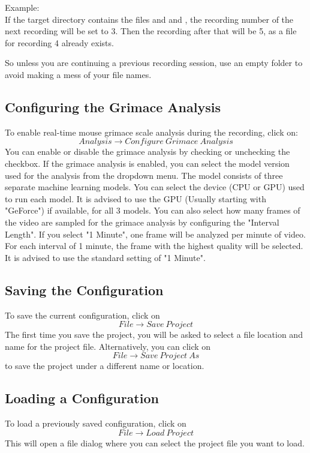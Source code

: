 Example:\\
If the target directory contains the files  and  and , 
the recording number of the next recording will be set to 3. Then the recording after that will be 5, 
as a file for recording 4 already exists.  

So unless you are continuing a previous recording session, 
use an empty folder to avoid making a mess of your file names.

\subsection{Configuring the Grimace Analysis}
To enable real-time mouse grimace scale analysis during the recording, 
click on: \[Analysis \rightarrow Configure\ Grimace\ Analysis\] 
You can enable or disable the grimace analysis by checking or unchecking the checkbox.  
If the grimace analysis is enabled, you can select the model version used for the analysis from the dropdown menu.  
The model consists of three separate machine learning models.  
You can select the device (CPU or GPU) used to run each model.
It is advised to use the GPU (Usually starting with "GeForce") if available, for all 3 models.  
You can also select how many frames of the video are sampled for the grimace analysis by configuring the "Interval Length".
If you select "1 Minute", one frame will be analyzed per minute of video. 
For each interval of 1 minute, the frame with the highest quality will be selected.  
It is advised to use the standard setting of "1 Minute".

\subsection{Saving the Configuration}
To save the current configuration, click on \[File \rightarrow Save\ Project\]
The first time you save the project, you will be asked to select a file location and name for the project file.  
Alternatively, you can click on \[File \rightarrow Save\ Project\ As\] to save the project under a different name or location.

\subsection{Loading a Configuration}
To load a previously saved configuration, click on \[File \rightarrow Load\ Project\]
This will open a file dialog where you can select the project file you want to load.

